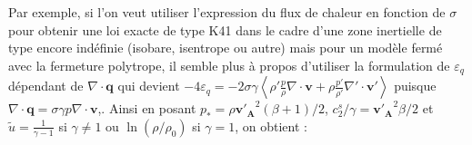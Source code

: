 Par exemple, si l'on veut utiliser l'expression du flux de chaleur en fonction de $\sigma$ pour obtenir une loi exacte de type \acs{K41} dans le cadre d'une zone inertielle de type encore indéfinie (isobare, isentrope ou autre) mais pour un modèle fermé avec la fermeture polytrope, il semble plus à propos d'utiliser la formulation de $\varepsilon_q$ dépendant de $\nabla \cdot \boldsymbol{q}$ qui devient
$- 4\varepsilon_q = - 2 \sigma \gamma\left< \rho'\frac{p}{\rho}\nabla \cdot \boldsymbol{v} + \rho\frac{p'}{\rho'}\nabla' \cdot \boldsymbol{v'} \right>$ puisque $\nabla \cdot \boldsymbol{q} = \sigma \gamma p \nabla \cdot \boldsymbol{v}$,.
Ainsi en posant $p_* = \rho\boldsymbol{v'_A}^2\left(\beta +1\right)/2$, $c^s_2/\gamma = \boldsymbol{v'_A}^2\beta/2$ et $\tilde{u} = \frac{1}{\gamma-1}$ si $\gamma \neq 1$ ou $\ln\left(\rho/\rho_0\right)$ si $\gamma =1$, on obtient : 
